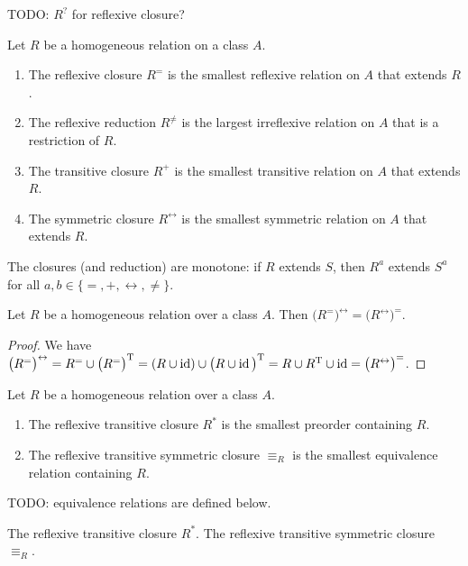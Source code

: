 TODO: $R^?$ for reflexive closure?

\begin{lemma}
Let $R$ be a homogeneous relation on a class $A$.
\begin{enumerate}
\item The reflexive closure $R^=$ is the smallest reflexive relation on $A$ that extends $R$.
\item The reflexive reduction $R^{\neq}$ is the largest irreflexive relation on $A$ that is a restriction of $R$.
\item The transitive closure $R^{+}$ is the smallest transitive relation on $A$ that extends $R$.
\item The symmetric closure $R^{\leftrightarrow}$ is the smallest symmetric relation on $A$ that extends $R$.
\end{enumerate}
\end{lemma}

\begin{lemma}
The closures (and reduction) are monotone: if $R$ extends $S$, then $R^a$ extends $S^a$ for all $a,b\in\{=,+,\leftrightarrow,\neq\}$.
\end{lemma}

\begin{lemma}
Let $R$ be a homogeneous relation over a class $A$. Then $\big(R^=\big)^\leftrightarrow = \big(R^\leftrightarrow\big)^=$.
\end{lemma}
\begin{proof}
We have $\big(R^=\big)^\leftrightarrow = R^=\cup \big(R^=\big)^{\mathrm{T}} = (R\cup \operatorname{id})\cup \big(R \cup \operatorname{id}\big)^{\mathrm{T}} = R\cup R^{\mathrm{T}} \cup \operatorname{id} = \big(R^\leftrightarrow\big)^=$.
\end{proof}

\begin{lemma}
Let $R$ be a homogeneous relation over a class $A$.
\begin{enumerate}
\item The reflexive transitive closure $R^*$ is the smallest preorder containing $R$.
\item The reflexive transitive symmetric closure $\equiv_R$ is the smallest equivalence relation containing $R$.
\end{enumerate}
\end{lemma}
TODO: equivalence relations are defined below.

\begin{definition}
The reflexive transitive closure $R^*$. The reflexive transitive symmetric closure $\equiv_R$.
\end{definition}

